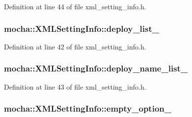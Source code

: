 Definition at line 44 of file xml\_\-setting\_\-info.h.

\hypertarget{classmocha_1_1_x_m_l_setting_info_aed09d69d81c7d7f897cd7c46846f1513}{
\subsubsection[{deploy\_\-list\_\-}]{ {\bf mocha::XMLSettingInfo::deploy\_\-list\_\-}}}
\label{classmocha_1_1_x_m_l_setting_info_aed09d69d81c7d7f897cd7c46846f1513}


Definition at line 42 of file xml\_\-setting\_\-info.h.

\hypertarget{classmocha_1_1_x_m_l_setting_info_a4e0e690ae9e8fa08b262e0412a5e6185}{
\subsubsection[{deploy\_\-name\_\-list\_\-}]{ {\bf mocha::XMLSettingInfo::deploy\_\-name\_\-list\_\-}}}
\label{classmocha_1_1_x_m_l_setting_info_a4e0e690ae9e8fa08b262e0412a5e6185}


Definition at line 43 of file xml\_\-setting\_\-info.h.

\hypertarget{classmocha_1_1_x_m_l_setting_info_aeb01f25660d607e290dbc03402072e2b}{
\subsubsection[{empty\_\-option\_\-}]{ {\bf mocha::XMLSettingInfo::empty\_\-option\_\-}}}
\label{classmocha_1_1_x_m_l_setting_info_aeb01f25660d607e290dbc03402072e2b}


